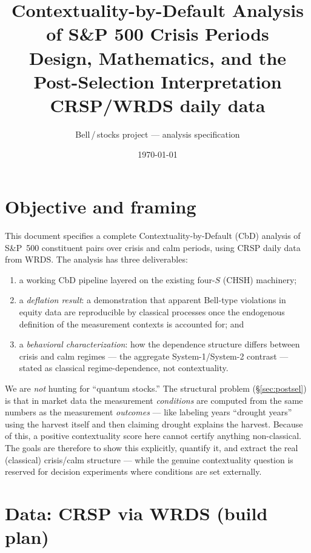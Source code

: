 \documentclass[11pt]{article}
\title{\textbf{Contextuality-by-Default Analysis of S\&P 500 Crisis Periods}\\[4pt]
\large Design, Mathematics, and the Post-Selection Interpretation\\
\normalsize CRSP/WRDS daily data}
\author{\small Bell\,/\,stocks project --- analysis specification}
\date{\small\today}
\begin{document}
\maketitle

\section{Objective and framing}

This document specifies a complete Contextuality-by-Default (CbD) analysis of S\&P~500
constituent pairs over crisis and calm periods, using CRSP daily data from WRDS. The analysis
has three deliverables:
\begin{enumerate}[leftmargin=1.6em,itemsep=1pt]
  \item a working CbD pipeline layered on the existing four-$S$ (CHSH) machinery;
  \item a \emph{deflation result}: a demonstration that apparent Bell-type violations in
        equity data are reproducible by classical processes once the endogenous definition of
        the measurement contexts is accounted for; and
  \item a \emph{behavioral characterization}: how the dependence structure differs between
        crisis and calm regimes --- the aggregate System-1/System-2 contrast --- stated as
        classical regime-dependence, not contextuality.
\end{enumerate}

\begin{intuition}
We are \emph{not} hunting for ``quantum stocks.'' The structural problem (\S\ref{sec:postsel})
is that in market data the measurement \emph{conditions} are computed from the same numbers as
the measurement \emph{outcomes} --- like labeling years ``drought years'' using the harvest
itself and then claiming drought explains the harvest. Because of this, a positive
contextuality score here cannot certify anything non-classical. The goals are therefore to show
this explicitly, quantify it, and extract the real (classical) crisis/calm structure --- while
the genuine contextuality question is reserved for decision experiments where conditions are
set externally.
\end{intuition}

\section{Data: CRSP via WRDS (build plan)}
\end{document}
